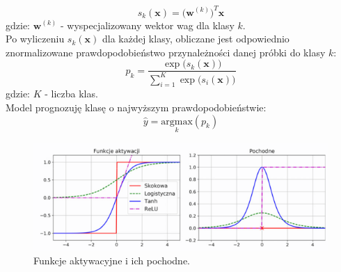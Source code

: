 \documentclass{article}
\renewcommand{\vec}[1]{\mathbf{#1}}
\begin{document}
\begin{itemize}
\begin{equation}
	s_k(\vec{x}) = \big(\vec{w}^{(k)}\big)^T\vec{x}
\end{equation}
gdzie: $\vec{w}^{(k)}$ - wyspecjalizowany wektor wag dla klasy $k$.\\
Po wyliczeniu $s_k(\vec{x})$ dla każdej klasy, obliczane jest odpowiednio znormalizowane 
prawdopodobieństwo przynależności danej próbki do klasy $k$:
\begin{equation}
	p_k = \frac{\exp\big(s_k(\vec{x})\big)}{\sum_{i=1}^{K} \exp\big(s_i(\vec{x})\big)}
\end{equation}
gdzie: $K$ - liczba klas.\\ 
Model prognozuję klasę o najwyższym prawdopodobieństwie:
\begin{equation}
	\hat{y} = \underset{k}{\text{argmax}}(p_k)
\end{equation}
\end{itemize}

\begin{figure}[H]
\centering
\includegraphics[scale=0.6]{f_a.png}
\caption{Funkcje aktywacyjne i ich pochodne.}
\end{figure}
\end{document}
